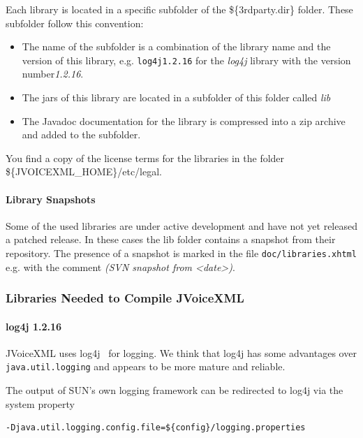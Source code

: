 \documentclass[11pt,a4paper]{article}
\begin{document}
Each library is located in a specific subfolder of the \$\{3rdparty.dir\}
folder. These subfolder follow this convention:

\begin{itemize}
\item The name of the subfolder is a combination of the library name and
the version of this library, e.g. \texttt{log4j1.2.16} for the \emph{log4j}
library with the version number\emph{1.2.16}.
\item The jars of this library are located in a subfolder of this folder
called \emph{lib}
\item The Javadoc documentation for the library is compressed into a zip
archive and added to the subfolder.
\end{itemize}

You find a copy of the license terms for the libraries in the folder\\
\$\{JVOICEXML\_HOME\}/etc/legal.

\paragraph{Library Snapshots}

Some of the used libraries are under active development and have not yet
released a patched release. In these cases the lib folder contains a snapshot
from their repository. The presence of a snapshot is marked in the file
\texttt{doc/libraries.xhtml} e.g. with the comment \emph{(SVN snapshot from
<date>)}.



\subsubsection{Libraries Needed to Compile JVoiceXML}
\label{sec:libr-need-comp}

\paragraph{log4j 1.2.16}

JVoiceXML uses log4j~\cite{apache:log4j} for logging. We think that log4j has 
some advantages
over \texttt{java.util.logging} and appears to be more mature and reliable.

The output of SUN's own logging framework can be redirected to log4j via the
system property
\begin{lstlisting}
-Djava.util.logging.config.file=${config}/logging.properties
\end{lstlisting}
\end{document}
